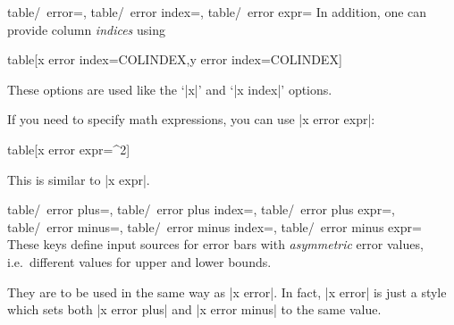 {\begin{pgfplotsxykeylist}{%
	table/\x\ error=,
	table/\x\ error index=,
	table/\x\ error expr=}
In addition, one can provide column \emph{indices} using
\begin{codeexample}
\addplot table[x error index=COLINDEX,y error index=COLINDEX]
\end{codeexample}
These options are used like the `|x|' and `|x index|' options.

If you need to specify math expressions, you can use |x error expr|:
\begin{codeexample}
\addplot table[x error expr=^2]
\end{codeexample}
This is similar to |x expr|.
\end{pgfplotsxykeylist}

\begin{pgfplotsxykeylist}{%
	table/\x\ error plus=,
	table/\x\ error plus index=,
	table/\x\ error plus expr=,
	table/\x\ error minus=,
	table/\x\ error minus index=,
	table/\x\ error minus expr=%
}
	These keys define input sources for error bars with \emph{asymmetric} error values, i.e.\ different values for upper and lower bounds.
	
	They are to be used in the same way as |x error|. In fact, |x error| is just a style which sets both |x error plus| and |x error minus| to the same value.

\begin{codeexample}[]
\end{codeexample}
\end{pgfplotsxykeylist}

}%
